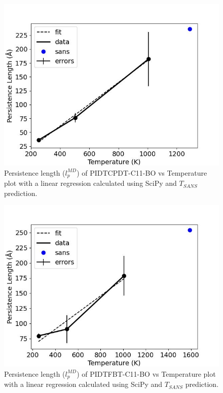 \begin{figure}
    \centering
    \includegraphics[width=1\linewidth]{src/figures/pers_l_figs/untitled folder/idt/cpdt_plot.jpeg}
    \caption{Persistence length ($l_p^{MD}$) of PIDTCPDT-C11-BO vs Temperature plot with a linear regression calculated using SciPy \citep{2020SciPy-NMeth} and $T_{SANS}$ prediction.}
    \label{fig:idtcpdt_plot}
\end{figure}

\begin{figure}
    \centering
    \includegraphics[width=1\linewidth]{src/figures/pers_l_figs/untitled folder/idt/fbt_plot.jpeg}
    \caption{Persistence length ($l_p^{MD}$) of PIDTFBT-C11-BO vs Temperature plot with a linear regression calculated using SciPy \citep{2020SciPy-NMeth} and $T_{SANS}$ prediction.}
    \label{fig:idt_fbt_plot}
\end{figure}


